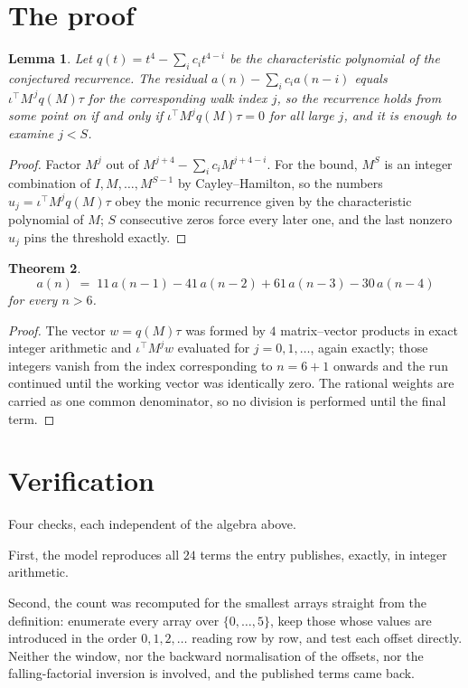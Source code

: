 \documentclass[11pt,a4paper]{article}
\theoremstyle{plain}
\newtheorem{theorem}{Theorem}
\newtheorem{lemma}[theorem]{Lemma}
\theoremstyle{definition}
\begin{document}
\section{The proof}

\begin{lemma}\label{lem:crit}
Let $q(t)=t^{4}-\sum_i c_it^{4-i}$ be the characteristic polynomial of the
conjectured recurrence. The residual $a(n)-\sum_ic_ia(n-i)$ equals
$\iota^{\!\top}M^{\,j}q(M)\tau$ for the corresponding walk index $j$, so the recurrence
holds from some point on if and only if $\iota^{\!\top}M^{j}q(M)\tau=0$ for all large $j$,
and it is enough to examine $j<S$.
\end{lemma}

\begin{proof}
Factor $M^{j}$ out of $M^{j+4}-\sum_ic_iM^{j+4-i}$. For the bound, $M^{S}$
is an integer combination of $I,M,\dots,M^{S-1}$ by Cayley--Hamilton, so the numbers
$u_j=\iota^{\!\top}M^{j}q(M)\tau$ obey the monic recurrence given by the characteristic
polynomial of $M$; $S$ consecutive zeros force every later one, and the last nonzero $u_j$
pins the threshold exactly.
\end{proof}

\begin{theorem}
\[
a(n)\;=\;11\,a(n-1) - 41\,a(n-2) + 61\,a(n-3) - 30\,a(n-4)
\]
for every $n>6$.
\end{theorem}

\begin{proof}
The vector $w=q(M)\tau$ was formed by $4$ matrix--vector products in exact integer
arithmetic and $\iota^{\!\top}M^{j}w$ evaluated for $j=0,1,\dots$, again exactly; those
integers vanish from the index corresponding to $n=6+1$ onwards and the run continued
until the working vector was identically zero. The rational weights are carried as one common
denominator, so no division is performed until the final term.
\end{proof}

\section{Verification}

Four checks, each independent of the algebra above.

First, the model reproduces all $24$ terms the entry publishes, exactly, in integer
arithmetic.

Second, the count was recomputed for the smallest arrays straight from the definition:
enumerate every array over $\{0,\dots,5\}$, keep those whose values are introduced in the
order $0,1,2,\dots$ reading row by row, and test each offset directly. Neither the window, nor
the backward normalisation of the offsets, nor the falling-factorial inversion is involved, and
the published terms came back.
\end{document}
